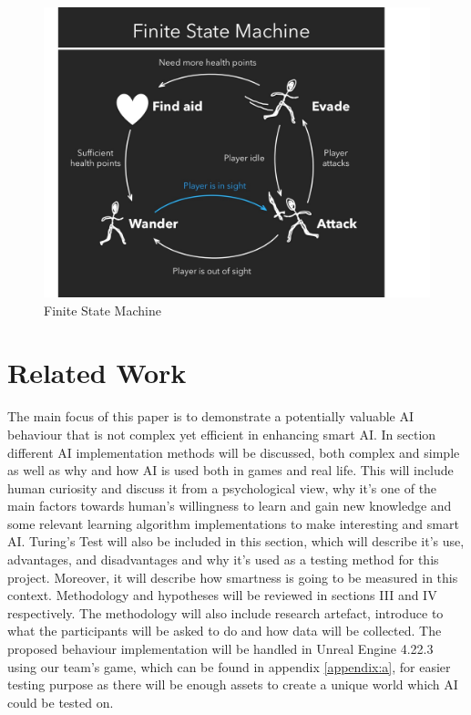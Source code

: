 \documentclass[journal]{IEEEtran}
\begin{document}
\begin{figure}
	\includegraphics[width=\linewidth]{FSM.jpg}
	\caption{Finite State Machine \cite{lou2017}}
	\label{fig:fsm}
\end{figure}

\section{Related Work} %
The main focus of this paper is to demonstrate a potentially valuable AI behaviour that is not complex yet efficient in enhancing smart AI. In section different AI implementation methods will be discussed, both complex and simple as well as why and how AI is used both in games and real life. This will include human curiosity and discuss it from a psychological view, why it's one of the main factors towards human's willingness to learn and gain new knowledge and some relevant learning algorithm implementations to make interesting and smart AI. Turing's Test will also be included in this section, which will describe it's use, advantages, and disadvantages and why it's used as a testing method for this project. Moreover, it will describe how smartness is going to be measured in this context. Methodology and hypotheses will be reviewed in sections III and IV respectively. The methodology will also include research artefact, introduce to what the participants will be asked to do and how data will be collected. The proposed behaviour implementation will be handled in Unreal Engine 4.22.3 using our team's game, which can be found in appendix \ref{appendix:a}, for easier testing purpose as there will be enough assets to create a unique world which AI could be tested on.
\end{document}
